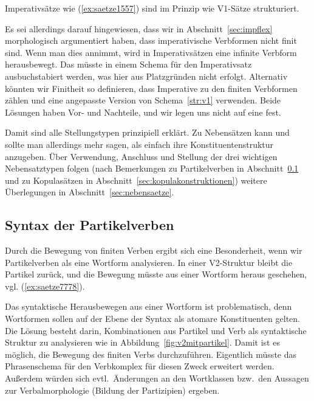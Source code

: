 Imperativsätze wie (\ref{ex:saetze1557}) sind im Prinzip wie V1-Sätze strukturiert.

\begin{exe}
\end{exe}

Es sei allerdings darauf hingewiesen, dass wir in Abschnitt~\ref{sec:impflex} morphologisch argumentiert haben, dass imperativische Verbformen nicht finit sind.
Wenn man dies annimmt, wird in Imperativsätzen eine infinite Verbform herausbewegt.
Das müsste in einem Schema für den Imperativsatz ausbuchstabiert werden, was hier aus Platzgründen nicht erfolgt.
Alternativ könnten wir Finitheit so definieren, dass Imperative zu den finiten Verbformen zählen und eine angepasste Version von Schema~\ref{str:v1} verwenden.
Beide Lösungen haben Vor- und Nachteile, und wir legen uns nicht auf eine fest.


Damit sind alle Stellungstypen prinzipiell erklärt.
Zu Nebensätzen kann und sollte man allerdings mehr sagen, als einfach ihre Konstituentenstruktur anzugeben.
Über Verwendung, Anschluss und Stellung der drei wichtigen Nebensatztypen folgen (nach Bemerkungen zu Partikelverben in Abschnitt~\ref{sec:partikelverben} und zu Kopulasätzen in Abschnitt~\ref{sec:kopulakonstruktionen}) weitere Überlegungen in Abschnitt~\ref{sec:nebensaetze}.

\Stretch

\subsection{Syntax der Partikelverben}

\label{sec:partikelverben}

Durch die Bewegung von finiten Verben ergibt sich eine Besonderheit, wenn wir Partikelverben als eine Wortform analysieren.
In einer V2-Struktur bleibt die Partikel zurück, und die Bewegung müsste aus einer Wortform heraus geschehen, vgl. (\ref{ex:saetze7778}).

\begin{exe}
\end{exe}


Das syntaktische Herausbewegen aus einer Wortform ist problematisch, denn Wortformen sollen auf der Ebene der Syntax als atomare Konstituenten gelten.
Die Lösung besteht darin, Kombinationen aus Partikel und Verb als syntaktische Struktur zu analysieren wie in Abbildung~\ref{fig:v2mitpartikel}.
Damit ist es möglich, die Bewegung des finiten Verbs durchzuführen.
Eigentlich müsste das Phrasenschema für den Verbkomplex für diesen Zweck erweitert werden.
Außerdem würden sich evtl.\ Änderungen an den Wortklassen bzw.\ den Aussagen zur Verbalmorphologie (\zB Bildung der Partizipien) ergeben.

